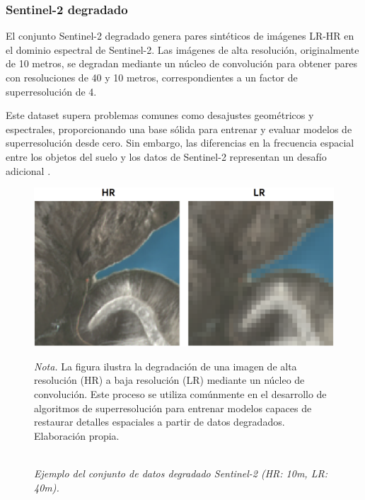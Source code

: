         
        \subsubsection{Sentinel-2 degradado}
        
            El conjunto Sentinel-2 degradado genera pares sintéticos de imágenes LR-HR en el dominio espectral de Sentinel-2. Las imágenes de alta resolución, originalmente de 10 metros, se degradan mediante un núcleo de convolución para obtener pares con resoluciones de 40 y 10 metros, correspondientes a un factor de superresolución de 4.
            
            Este dataset supera problemas comunes como desajustes geométricos y espectrales, proporcionando una base sólida para entrenar y evaluar modelos de superresolución desde cero. Sin embargo, las diferencias en la frecuencia espacial entre los objetos del suelo y los datos de Sentinel-2 representan un desafío adicional \autocite{wang2016fusion}.
            

            \begin{figure}[H]
                \caption{\doublespacing \\ \textit{Ejemplo del conjunto de datos degradado Sentinel-2 (HR: 10m, LR: 40m).}} 
                \centering
                \includegraphics[width=1\linewidth]{images/hr_lr_degraded.png}
                \begin{justify}
                    \textit{Nota.} La figura ilustra la degradación de una imagen de alta resolución (HR) a baja resolución (LR) mediante un núcleo de convolución. Este proceso se utiliza comúnmente en el desarrollo de algoritmos de superresolución para entrenar modelos capaces de restaurar detalles espaciales a partir de datos degradados. Elaboración propia.
                \end{justify}                    
                \label{fig:hr_lr_degraded}
            \end{figure}
            

